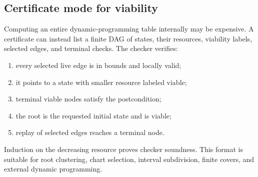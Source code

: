 \subsection{Certificate mode for viability}

Computing an entire dynamic-programming table internally may be expensive.  A certificate can instead list a finite DAG of states, their resources, viability labels, selected edges, and terminal checks.  The checker verifies:
\begin{enumerate}
\item every selected live edge is in bounds and locally valid;
\item it points to a state with smaller resource labeled viable;
\item terminal viable nodes satisfy the postcondition;
\item the root is the requested initial state and is viable;
\item replay of selected edges reaches a terminal node.
\end{enumerate}
Induction on the decreasing resource proves checker soundness.  This format is suitable for root clustering, chart selection, interval subdivision, finite covers, and external dynamic programming.
